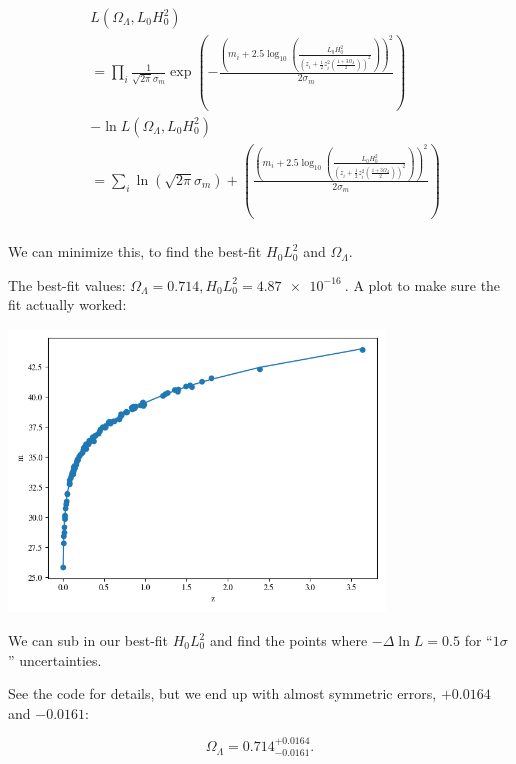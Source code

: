 \begin{enumerate}[label=\textbf{\Alph*}.]
    \begin{align*}
        &L(\Omega_\Lambda, L_0H_0^2) \\
        &= \prod_i \frac{1}{\sqrt{2\pi}\sigma_m} \exp\left(-\frac{\left(m_i + 2.5\log_{10}\left(\frac{L_0H_0^2}{\left(z_i + \frac{1}{2}z_i^2 (\frac{1 +3 \Omega_\Lambda}{2})\right)^2}\right)\right)^2}{2\sigma_m}\right) \\
        &-\ln L(\Omega_\Lambda, L_0H_0^2) \\
        &= \sum_i \ln(\sqrt{2\pi}\sigma_m) + \left(\frac{\left(m_i + 2.5\log_{10}\left(\frac{L_0H_0^2}{\left(z_i + \frac{1}{2}z_i^2 (\frac{1 +3 \Omega_\Lambda}{2})\right)^2}\right)\right)^2}{2\sigma_m}\right) \\
    \end{align*}

    We can minimize this, to find the best-fit $H_0L_0^2$ and $\Omega_\Lambda$.

    The best-fit values: $\Omega_\Lambda = 0.714, H_0L_0^2 = \SI{4.87e-16}{}$. A plot to make sure the fit actually worked:

    \begin{center}
        \includegraphics[width=0.75\textwidth]{images/q3_a_fit.png}
    \end{center}

    We can sub in our best-fit $H_0L_0^2$ and find the points where $-\Delta \ln L = 0.5$ for ``$1\sigma$'' uncertainties.

    See the code for details, but we end up with almost symmetric errors, $+0.0164$ and $-0.0161$:

    $$\Omega_\Lambda = 0.714^{+0.0164}_{-0.0161}.$$


\end{enumerate}
